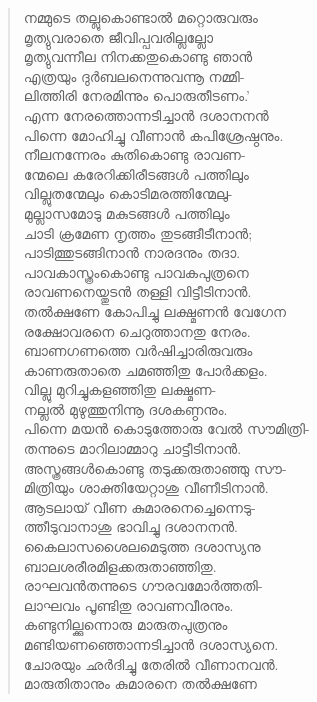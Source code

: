 \begin{verse}
നമ്മുടെ തല്ലുകൊണ്ടാല്‍ മറ്റൊരുവരും\\
മൃത്യുവരാതെ ജീവിപ്പവരില്ലല്ലോ\\
മൃത്യുവന്നീല നിനക്കതുകൊണ്ടു ഞാന്‍\\
എത്രയും ദുര്‍ബലനെന്നുവന്നൂ നമ്മി-\\
ലിത്തിരി നേരമിന്നും പൊരുതീടണം.’\\
എന്ന നേരത്തൊന്നടിച്ചാന്‍ ദശാനനന്‍\\
പിന്നെ മോഹിച്ചു വീണാന്‍ കപിശ്രേഷ്ഠനും.\\
നീലനന്നേരം കുതികൊണ്ടു രാവണ-\\
ന്മേലെ കരേറിക്കിരീടങ്ങള്‍ പത്തിലും\\
വില്ലുതന്മേലും കൊടിമരത്തിന്മേലു-\\
മുല്ലാസമോടു മകുടങ്ങള്‍ പത്തിലും\\
ചാടി ക്രമേണ നൃത്തം തുടങ്ങീടീനാന്‍;\\
പാടിത്തുടങ്ങിനാന്‍ നാരദനും തദാ.\\
പാവകാസ്ത്രംകൊണ്ടു പാവകപുത്രനെ\\
രാവണനെയ്തുടന്‍ തള്ളി വിട്ടീടിനാന്‍.\\
തല്‍ക്ഷണേ കോപിച്ചു ലക്ഷ്മണന്‍ വേഗേന\\
രക്ഷോവരനെ ചെറുത്താനതു നേരം.\\
ബാണഗണത്തെ വര്‍ഷിച്ചാരിരുവരും\\
കാണരുതാതെ ചമഞ്ഞിതു പോര്‍ക്കളം.\\
വില്ലു മുറിച്ചുകളഞ്ഞിതു ലക്ഷ്മണ-\\
നല്ലല്‍ മുഴുത്തുനിന്നൂ ദശകണ്ഠനും.\\
പിന്നെ മയന്‍ കൊടുത്തോരു വേല്‍ സൗമിത്രി-\\
തന്നുടെ മാറിലാമ്മാറു ചാട്ടീടിനാന്‍.\\
അസ്ത്രങ്ങള്‍കൊണ്ടു തടുക്കരുതാഞ്ഞു സൗ-\\
മിത്രിയും ശാക്തിയേറ്റാശു വീണീടിനാന്‍.\\
ആടലായ് വീണ കുമാരനെച്ചെന്നെടു-\\
ത്തീടുവാനാശു ഭാവിച്ചു ദശാനനന്‍.\\
കൈലാസശൈലമെടുത്ത ദശാസ്യനു\\
ബാലശരീരമിളക്കരുതാഞ്ഞിതു.\\
രാഘവന്‍തന്നുടെ ഗൗരവമോര്‍ത്തതി-\\
ലാഘവം പൂണ്ടിതു രാവണവീരനും.\\
കണ്ടുനില്ക്കുന്നൊരു മാരുതപുത്രനും\\
മണ്ടിയണഞ്ഞൊന്നടിച്ചാന്‍ ദശാസ്യനെ.\\
ചോരയും ഛര്‍ദിച്ചു തേരില്‍ വീണാനവന്‍.\\
മാരുതിതാനും കുമാരനെ തല്‍ക്ഷണേ\\

\end{verse}
